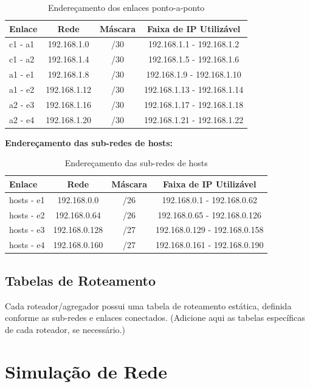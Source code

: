 \documentclass[conference,compsoc]{IEEEtran}
\begin{document}
\begin{otherlanguage}{brazil}
\begin{table}[h]
\centering
\begin{tabular}{|l|c|c|c|}
\hline
Enlace & Rede & Máscara & Faixa de IP Utilizável \\
\hline
c1 - a1 & 192.168.1.0 & /30 & 192.168.1.1 - 192.168.1.2 \\
\hline
c1 - a2 & 192.168.1.4 & /30 & 192.168.1.5 - 192.168.1.6 \\
\hline
a1 - e1 & 192.168.1.8 & /30 & 192.168.1.9 - 192.168.1.10 \\
\hline
a1 - e2 & 192.168.1.12 & /30 & 192.168.1.13 - 192.168.1.14 \\
\hline
a2 - e3 & 192.168.1.16 & /30 & 192.168.1.17 - 192.168.1.18 \\
\hline
a2 - e4 & 192.168.1.20 & /30 & 192.168.1.21 - 192.168.1.22 \\
\hline
\end{tabular}
\caption{Endereçamento dos enlaces ponto-a-ponto}
\end{table}

\textbf{Endereçamento das sub-redes de hosts:}

\begin{table}[h]
\centering
\begin{tabular}{|l|c|c|c|}
\hline
Enlace & Rede & Máscara & Faixa de IP Utilizável \\
\hline
hosts - e1 & 192.168.0.0 & /26 & 192.168.0.1 - 192.168.0.62 \\
\hline
hosts - e2 & 192.168.0.64 & /26 & 192.168.0.65 - 192.168.0.126 \\
\hline
hosts - e3 & 192.168.0.128 & /27 & 192.168.0.129 - 192.168.0.158 \\
\hline
hosts - e4 & 192.168.0.160 & /27 & 192.168.0.161 - 192.168.0.190 \\
\hline
\end{tabular}
\caption{Endereçamento das sub-redes de hosts}
\end{table}

\subsection{Tabelas de Roteamento}

Cada roteador/agregador possui uma tabela de roteamento estática, definida conforme as sub-redes e enlaces conectados. (Adicione aqui as tabelas específicas de cada roteador, se necessário.)

\section{Simulação de Rede}


\end{otherlanguage}
\end{document}
